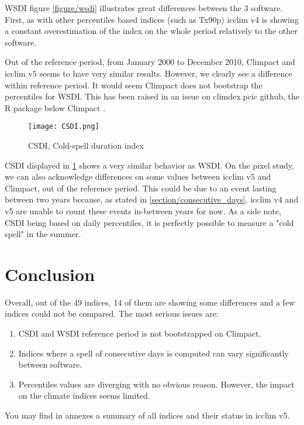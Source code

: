 \documentclass[a4paper,11pt]{article}
\begin{document}
        WSDI figure \ref{figure/wsdi} illustrates great differences between the 3 software.\\
        First, as with other percentiles based indices (such as Tx90p) icclim v4 is showing a constant overestimation of the index on the whole period relatively to the other software.

        Out of the reference period, from January 2000 to December 2010, Climpact and icclim v5 seems to have very similar results.
        However, we clearly see a difference within reference period. It would seem Climpact does not bootstrap the percentiles for WSDI.
        This has been raised in an issue on climdex.pcic github, the R package below Climpact \cite{gh/wsdi_issue}.
    
        \begin{figure}[h]
            \centering
            \texttt{[image: CSDI.png]}
            \caption{CSDI, Cold-spell duration index}
            \label{figure/csdi}
        \end{figure}

        CSDI displayed in \ref{figure/csdi} shows a very similar behavior as WSDI.
        On the pixel study, we can also acknowledge differences on some values between icclim v5 and Climpact, out of the reference period.
        This could be due to an event lasting between two years because, as stated in \ref{section/consecutive_days}, icclim v4 and v5 are unable to count these events in-between years for now.
        As a side note, CSDI being based on daily percentiles, it is perfectly possible to measure a "cold spell" in the summer.

\part{Conclusion}
    Overall, out of the 49 indices, 14 of them are showing some differences and a few indices could not be compared.
    The most serious issues are:
    \begin{enumerate}
        \item CSDI and WSDI reference period is not bootstrapped on Climpact.
        \item Indices where a spell of consecutive days is computed can vary significantly between software.
        \item Percentiles values are diverging with no obvious reason. However, the impact on the climate indices seems limited.
    \end{enumerate}
    You may find in annexes a summary of all indices and their status in icclim v5.
\end{document}
